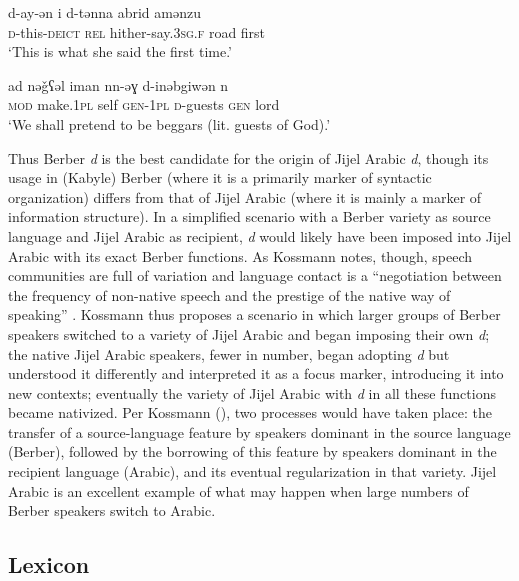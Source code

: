 \documentclass[output=paper]{langsci/langscibook}
\begin{document}
\ea\label{Berber cleft}

\gll d-ay-ǝn  i  d-tǝnna  abrid  amǝnzu\\
     \textsc{d}-this-\textsc{deict}  \textsc{rel}  hither-say.\textsc{3sg.f}  road  first\\
\glt ‘This is what she said the first time.’
\z

\ea\label{Berber secondary}

\gll ad  nǝǧʕǝl  iman  nn-ǝɣ  d-inǝbgiwǝn  n  \\
     \textsc{mod} make.\textsc{1pl} self \textsc{gen-1pl}  \textsc{d}-guests \textsc{gen}  lord\\
\glt ‘We shall pretend to be beggars (lit. guests of God).’
\z

Thus Berber \textit{d} is the best candidate for the origin of Jijel Arabic \textit{d}, though its usage in (Kabyle) Berber (where it is a primarily marker of syntactic organization) differs from that of Jijel Arabic (where it is mainly a marker of information structure). In a simplified scenario with a Berber variety as source language and Jijel Arabic as recipient, \textit{d} would likely have been imposed into Jijel Arabic with its exact Berber functions. As Kossmann notes, though, speech communities are full of variation and language contact is a “negotiation between the frequency of non-native speech and the prestige of the native way of speaking” \citep[138]{Kossmann2014}. Kossmann thus proposes a scenario in which larger groups of Berber speakers switched to a variety of Jijel Arabic and began imposing their own \textit{d}; the native Jijel Arabic speakers, fewer in number, began adopting \textit{d} but understood it differently and interpreted it as a focus marker, introducing it into new contexts; eventually the variety of Jijel Arabic with \textit{d} in all these functions became nativized. Per Kossmann (\citeyear[138]{Kossmann2014}), two processes would have taken place: the transfer of a source-language feature by speakers dominant in the source language (Berber), followed by the borrowing of this feature by speakers dominant in the recipient language (Arabic), and its eventual regularization in that variety. Jijel Arabic is an excellent example of what may happen when large numbers of Berber speakers switch to Arabic.

\subsection{Lexicon}
\end{document}
